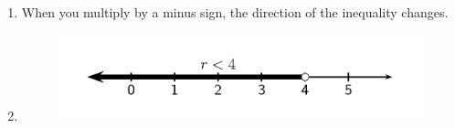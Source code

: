 {\begin{mdframed}[linewidth=4, leftmargin=40, rightmargin=40]
\begin{exercise}
\begin{enumerate}[noitemsep, label=\textbf{Step} \textbf{\arabic*}. ]
      
      \item  
      \label{m39254*id157909}When you multiply by a minus sign, the direction of the inequality changes.\par 
      \label{m39254*id157913}\nopagebreak\noindent{}
    
      
      \item  
      \label{m39254*id157934}
        
    \setcounter{subfigure}{0}


	\begin{figure}[H] %
    \begin{center}
    \label{m39254*id157937!!!underscore!!!media}\label{m39254*id157937!!!underscore!!!printimage}\includegraphics{col11306.imgs/m39254_MG10C10_003.png} %
        
      \vspace{2pt}
    \vspace{.1in}
    

\end{center}
\end{figure}
\end{enumerate}
\end{exercise}
\end{mdframed}}
